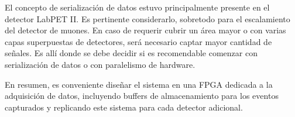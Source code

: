 	El concepto de serialización de datos estuvo principalmente presente en el detector LabPET II. Es pertinente considerarlo, sobretodo para el escalamiento del detector de muones. En caso de requerir cubrir un área mayor o con varias capas superpuestas de detectores, será necesario captar mayor cantidad de señales. Es allí donde se debe decidir si es recomendable comenzar con serialización de datos o con paralelismo de hardware.%
	
	
	
	En resumen, es conveniente diseñar el sistema en una FPGA dedicada a la adquisición de datos, incluyendo buffers de almacenamiento para los eventos capturados y replicando este sistema para cada detector adicional.
	